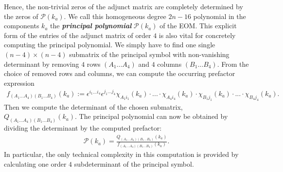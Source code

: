 Hence, the non-trivial zeros of the adjunct matrix are completely determined by the zeros of $\mathcal{P}(k_a)$. We call this homogeneous degree $2n-16$ polynomial in the components $k_a$ the \textit{\textbf{principal polynomial}} $\mathcal{P}(k_a)$ of the EOM.
This explicit form of the entries of the adjunct matrix of order $4$ is also vital for concretely computing the principal polynomial. We simply have to find one single $(n-4) \times (n-4)$ submatrix of the principal symbol with non-vanishing determinant by removing $4$ rows $(A_1...A_4)$ and $4$ columns $(B_1...B_4)$. From the choice of removed rows and columns, we can compute the occurring prefactor expression 
\begin{align}\label{prefacF}
f_{(A_1...A_4)(B_1...B_4)}(k_a) := \epsilon^{i_1...i_4} \epsilon^{j_1...j_4} \chi_{A_1i_1}(k_a) \cdot ... \cdot \chi_{A_4i_4}(k_a) \cdot \chi_{B_1j_1}(k_a) \cdot ... \cdot \chi_{B_4j_4}(k_a).
\end{align}
Then we compute the determinant of the chosen submatrix, $Q_{(A_1...A_4)(B_1...B_4)}(k_a)$. The principal polynomial can now be obtained by dividing the determinant by the computed prefactor:
\begin{align}
    \mathcal{P}(k_a) = \frac{Q_{(A_1...A_4)(B_1...B_4)}(k_a)}{f_{(A_1...A_4)(B_1...B_4)}(k_a)}.
\end{align}
In particular, the only technical complexity in this computation is provided by calculating one order $4$ subdeterminant of the principal symbol. 

